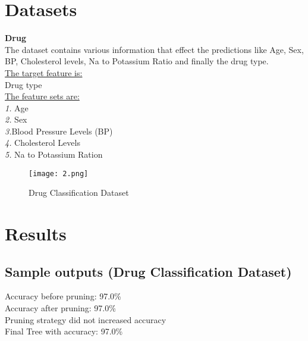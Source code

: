 \documentclass[conference,compsoc]{IEEEtran}
\begin{document}
\section{Datasets }
\large{\textbf{Drug}}\\
The dataset contains various information that effect the predictions like Age, Sex, BP, Cholesterol levels, Na to Potassium Ratio and finally the drug type. \\

\underline{The target feature is:}
\\ \textendash Drug type\\

\underline{The feature sets are:}\\
   \textit{1.} Age\\
   \textit{2.} Sex\\
    \textit{3.}Blood Pressure Levels (BP)\\
   \textit{4.} Cholesterol Levels\\
   \textit{5.} Na to Potassium Ration\\
   
\begin{figure}[H]
\centering
\texttt{[image: 2.png]}

\caption{Drug Classification Dataset }
\label{fig_error}

\end{figure}  


\section{Results}

 \subsection{Sample outputs (Drug Classification Dataset)}
 \textendash Accuracy before pruning: 97.0\%
\\\textendash Accuracy after pruning: 97.0\%
 \\Pruning strategy did not increased accuracy
 \\\textendash Final Tree with accuracy: 97.0\%
 


 
 
\end{document}
